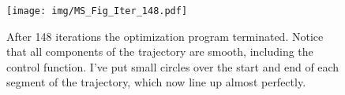 


\begin{figure} 
    \centering 
    \texttt{[image: img/MS\_Fig\_Iter\_148.pdf]}    
    \caption{ After 148 iterations the optimization program terminated. Notice that all components of the trajectory are smooth, including the control function. I've put small circles over the start and end of each segment of the trajectory, which now line up almost perfectly.}     
    \label{fig: MS_Fig_Iter_148}     
\end{figure} 


\FloatBarrier